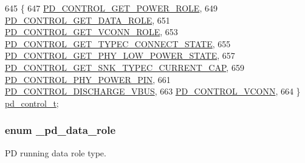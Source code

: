 \begin{DoxyCode}
645 \{
647     \hyperlink{group__usb__pd__stack_gga0edd2a390d28d96646bc71aac1858af1a04f2cae987c5f93bcd07bcffd679548e}{PD\_CONTROL\_GET\_POWER\_ROLE},
649     \hyperlink{group__usb__pd__stack_gga0edd2a390d28d96646bc71aac1858af1a06f4d2e5460a98f33e36db26ee0576cf}{PD\_CONTROL\_GET\_DATA\_ROLE},
651     \hyperlink{group__usb__pd__stack_gga0edd2a390d28d96646bc71aac1858af1a157e80a587dd98e5cd78e9927b4c4994}{PD\_CONTROL\_GET\_VCONN\_ROLE},
653     \hyperlink{group__usb__pd__stack_gga0edd2a390d28d96646bc71aac1858af1ad8f600ed0992d656036ca0a272d680ad}{PD\_CONTROL\_GET\_TYPEC\_CONNECT\_STATE},
655     \hyperlink{group__usb__pd__stack_gga0edd2a390d28d96646bc71aac1858af1aa58ce53ecaeed9f620eda031d4e5f342}{PD\_CONTROL\_GET\_PHY\_LOW\_POWER\_STATE},
657     \hyperlink{group__usb__pd__stack_gga0edd2a390d28d96646bc71aac1858af1a16509ea70890f75b3f97c5af3e7e04d5}{PD\_CONTROL\_GET\_SNK\_TYPEC\_CURRENT\_CAP},
659     \hyperlink{group__usb__pd__stack_gga0edd2a390d28d96646bc71aac1858af1a219d3fe217c5bf11a8126d09ee9fdb0c}{PD\_CONTROL\_PHY\_POWER\_PIN},
661     \hyperlink{group__usb__pd__stack_gga0edd2a390d28d96646bc71aac1858af1ab4baaafc5cca20f365d103a948261b1f}{PD\_CONTROL\_DISCHARGE\_VBUS},
663     \hyperlink{group__usb__pd__stack_gga0edd2a390d28d96646bc71aac1858af1a62e8479d23bf1208d5735aa76ff2aef6}{PD\_CONTROL\_VCONN},
664 \} \hyperlink{group__usb__pd__stack_ga880e41e7aafed69c34035517d1bbb7b6}{pd\_control\_t};
\end{DoxyCode}
\hypertarget{group__usb__pd__stack_ga25760887aa95821023cc0ab5e151f828}{
\subsubsection[{\-\_\-pd\-\_\-data\-\_\-role}]{\setlength{\rightskip}{0pt plus 5cm}enum {\bf \-\_\-pd\-\_\-data\-\_\-role}}}\label{group__usb__pd__stack_ga25760887aa95821023cc0ab5e151f828}


P\-D running data role type. 

